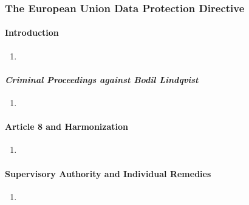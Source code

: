 \subsubsection{The European Union Data Protection Directive}

\paragraph{Introduction} %

\begin{enumerate}
    \item
\end{enumerate}

\paragraph{\emph{Criminal Proceedings against Bodil Lindqvist}} %

\begin{enumerate}
    \item
\end{enumerate}

\paragraph{Article 8 and Harmonization} %

\begin{enumerate}
    \item 
\end{enumerate}

\paragraph{Supervisory Authority and Individual Remedies} %

\begin{enumerate}
    \item
\end{enumerate}

